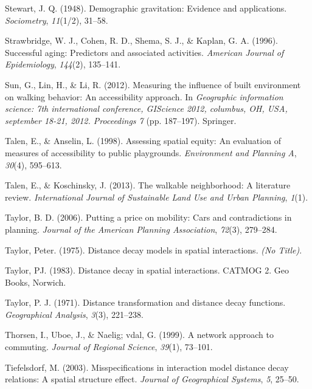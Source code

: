 \documentclass[
11pt, %
oneside, %
english, %
singlespacing, %
]{macthesis} %
\newlength{\cslhangindent}
\newenvironment{CSLReferences}[2] %
{\begin{list}{}{%
	\setlength{\itemindent}{0pt}
	\setlength{\leftmargin}{0pt}
	\setlength{\parsep}{0pt}
	\ifodd #1
	\setlength{\leftmargin}{\cslhangindent}
	\setlength{\itemindent}{-1\cslhangindent}
	\fi
	\setlength{\itemsep}{#2\baselineskip}}}
{\end{list}}
\begin{document}
\begin{CSLReferences}{1}{0}
Stewart, J. Q. (1948). Demographic gravitation: Evidence and applications. \emph{Sociometry}, \emph{11}(1/2), 31--58.

Strawbridge, W. J., Cohen, R. D., Shema, S. J., \& Kaplan, G. A. (1996). Successful aging: Predictors and associated activities. \emph{American Journal of Epidemiology}, \emph{144}(2), 135--141.

Sun, G., Lin, H., \& Li, R. (2012). Measuring the influence of built environment on walking behavior: An accessibility approach. In \emph{Geographic information science: 7th international conference, GIScience 2012, columbus, OH, USA, september 18-21, 2012. Proceedings 7} (pp. 187--197). Springer.

Talen, E., \& Anselin, L. (1998). Assessing spatial equity: An evaluation of measures of accessibility to public playgrounds. \emph{Environment and Planning A}, \emph{30}(4), 595--613.

Talen, E., \& Koschinsky, J. (2013). The walkable neighborhood: A literature review. \emph{International Journal of Sustainable Land Use and Urban Planning}, \emph{1}(1).

Taylor, B. D. (2006). Putting a price on mobility: Cars and contradictions in planning. \emph{Journal of the American Planning Association}, \emph{72}(3), 279--284.

Taylor, Peter. (1975). Distance decay models in spatial interactions. \emph{(No Title)}.

Taylor, PJ. (1983). Distance decay in spatial interactions. CATMOG 2. Geo Books, Norwich.

Taylor, P. J. (1971). Distance transformation and distance decay functions. \emph{Geographical Analysis}, \emph{3}(3), 221--238.

Thorsen, I., Uboe, J., \& Naelig; vdal, G. (1999). A network approach to commuting. \emph{Journal of Regional Science}, \emph{39}(1), 73--101.

Tiefelsdorf, M. (2003). Misspecifications in interaction model distance decay relations: A spatial structure effect. \emph{Journal of Geographical Systems}, \emph{5}, 25--50.


\end{CSLReferences}
\end{document}
